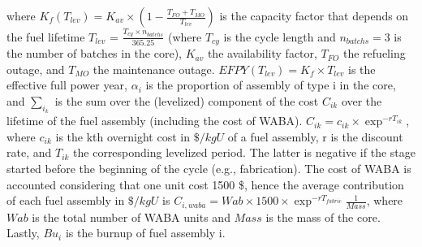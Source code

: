 \documentclass[a4paper]{article}
\begin{document}
where $K_f(T_{lev}) = K_{av} \times (1 - \frac{T_{FO} + T_{MO}}{T_{lev}})$ is the capacity factor that depends on the fuel lifetime $T_{lev}$ = $\frac{T_{cy}\times n_{batchs}}{365.25}$ (where $T_{cy}$ is the cycle length and $n_{batchs} = 3$ is the number of batches in the core), $K_{av}$ the availability factor, $T_{FO}$ the refueling outage, and $T_{MO}$ the maintenance outage. $EFPY(T_{lev}) = K_f \times T_{lev}$ is the effective full power year,   $\alpha_i$ is the proportion of assembly of type i in the core, and $\sum_{i_k}$ is the sum over the (levelized) component of the cost $C_{ik}$ over the lifetime of the fuel assembly (including the cost of WABA). $C_{ik} = c_{ik} \times \exp^{- r T_{ik}}$, where $c_{ik}$ is the kth overnight cost in $\$/kgU$ of a fuel assembly, r is the discount rate, and $T_{ik}$ the corresponding levelized period. The latter is negative if the stage started before the beginning of the cycle (e.g., fabrication). The cost of WABA is accounted considering that one unit cost 1500 \$, hence the average contribution of each fuel assembly in $\$/kgU$ is $C_{i,waba} = Wab \times 1500 \times \exp^{- r T_{fabric}}\frac{1}{Mass}$, where $Wab$ is the total number of WABA units and $Mass$ is the mass of the core.  Lastly, $Bu_i$ is the burnup of fuel assembly i. 
\end{document}
